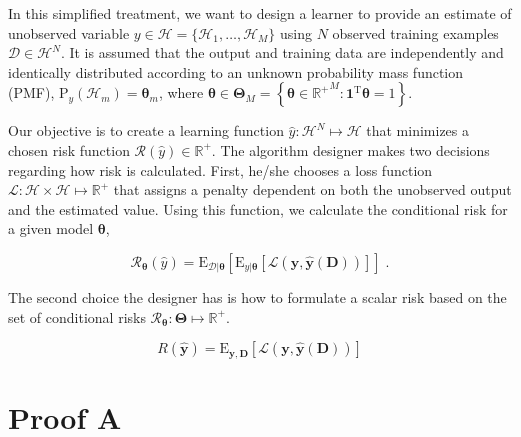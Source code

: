 \documentclass[11pt]{article}
\begin{document}
In this simplified treatment, we want to design a learner to provide an estimate of unobserved variable $y \in \mathcal{H} = \{ \mathcal{H}_1, \ldots, \mathcal{H}_M \}$ using $N$ observed training examples $\mathcal{D} \in \mathcal{H}^N$. It is assumed that the output and training data are independently and identically distributed according to an unknown probability mass function (PMF), $\text{P}_{y} \left(\mathcal{H}_{m}\right) = \bm{\theta}_m$, where $\bm{\theta} \in \bm{\Theta}_M = \left\{ \bm{\theta} \in {\mathbb{R}^+}^M: \bm{1}^\text{T}\bm{\theta} = 1 \right\}$. 


Our objective is to create a learning function $\hat{y}: \mathcal{H}^N \mapsto \mathcal{H}$ that minimizes a chosen risk function $\mathcal{R}(\hat{y}) \in \mathbb{R}^+$.  The algorithm designer makes two decisions regarding how risk is calculated. First, he/she chooses a loss function $\mathcal{L}: \mathcal{H} \times \mathcal{H} \mapsto \mathbb{R}^+$ that assigns a penalty dependent on both the unobserved output and the estimated value. Using this function, we calculate the conditional risk for a given model $\bm{\theta}$,

\begin{equation}
\mathcal{R}_{\bm{\theta}}(\hat{y}) = \text{E}_{\mathcal{D}|\bm{\theta}} \left[ \text{E}_{y|\bm{\theta}} \left[ \mathcal{L}(\bm{y},\hat{\bm{y}}(\bm{D})) \right] \right] \;.
\end{equation}

The second choice the designer has is how to formulate a scalar risk based on the set of conditional risks $\mathcal{R}_{\bm{\theta}}: \bm{\Theta} \mapsto \mathbb{R}^+$.



\begin{equation}
R(\hat{\bm{y}}) = \text{E}_{\bm{y},\bm{D}} \left[ \mathcal{L}(\bm{y},\hat{\bm{y}}(\bm{D})) \right]
\end{equation}




\appendix

\section{Proof A}
\end{document}
